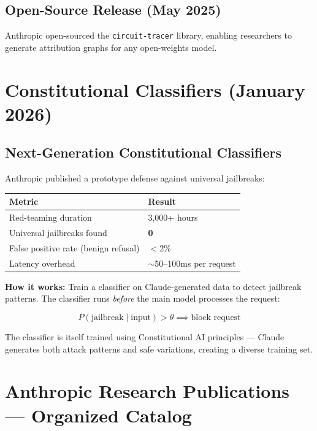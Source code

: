 \documentclass[11pt,a4paper]{article}
\begin{document}
\subsection{Open-Source Release (May 2025)}

Anthropic open-sourced the \texttt{circuit-tracer} library, enabling researchers to generate attribution graphs for any open-weights model.

\section{Constitutional Classifiers (January 2026)}

\subsection{Next-Generation Constitutional Classifiers}

Anthropic published a prototype defense against universal jailbreaks:

\begin{center}
\begin{tabular}{ll}
\toprule
\textbf{Metric} & \textbf{Result} \\
\midrule
Red-teaming duration & 3,000+ hours \\
Universal jailbreaks found & \textbf{0} \\
False positive rate (benign refusal) & $<$2\% \\
Latency overhead & $\sim$50--100ms per request \\
\bottomrule
\end{tabular}
\end{center}

\textbf{How it works:} Train a classifier on Claude-generated data to detect jailbreak patterns. The classifier runs \textit{before} the main model processes the request:

$$P(\text{jailbreak} \mid \text{input}) > \theta \implies \text{block request}$$

The classifier is itself trained using Constitutional AI principles --- Claude generates both attack patterns and safe variations, creating a diverse training set.

\section{Anthropic Research Publications --- Organized Catalog}
\end{document}
